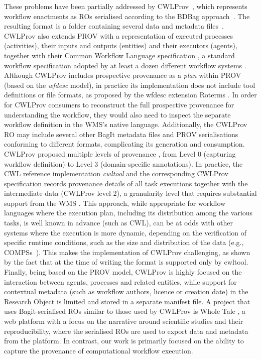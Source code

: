 These problems have been partially addressed by CWLProv~\cite{Khan 2019}, which represents workflow enactments as ROs serialised according to the BDBag approach~\cite{Chard 2016}.
The resulting format is a folder containing several data and metadata files~\cite{Soiland-Reyes 2018}.
CWLProv also extends PROV with a representation of executed processes (activities), their inputs and outputs (entities) and their executors (agents), together with their Common Workflow Language specification
\cite{Crusoe 2022}, a standard workflow specification adopted by at least a dozen different workflow systems . Although CWLProv includes prospective provenance as a \emph{plan}
within PROV (based on the \emph{wfdesc} model), in practice its implementation does not include tool definitions or file formats, as proposed by the wfdesc extension Roterms .
In order for CWLProv consumers to reconstruct the full prospective provenance for understanding the workflow, they would also need to inspect the separate workflow definition in the WMS's native language.
Additionally, the CWLProv RO may include several other BagIt metadata files and PROV serialisations conforming to different formats, complicating its generation and consumption.
CWLProv proposed multiple levels of provenance \cite[figure 2]{Khan 2019}, from Level 0 (capturing workflow definition) to Level 3 (domain-specific annotations). 
In practice, the CWL reference implementation \emph{cwltool} \cite{Amstutz 2023} and the corresponding CWLProv specification \cite{Soiland-Reyes 2018} records provenance details of all task executions together with the intermediate data (CWLProv level 2), a granularity level that requires substantial support from the WMS
\cite{Soiland-Reyes 2022}.
This approach, while appropriate for workflow languages where the execution plan, including its distribution among the various tasks, is well known in advance (such as CWL), can be at odds with other systems where the execution is more dynamic, depending on the verification of specific runtime conditions, such as the size and distribution of the data (e.g., COMPSs~\cite{Lordan 2014}).
This makes the implementation of CWLProv challenging, as shown by the fact that at the time of writing the format is supported only by cwltool.
Finally, being based on the PROV model, CWLProv is highly focused on the interaction between agents, processes and related entities, while support for contextual metadata (such as workflow authors, licence or creation date) in the Research Object is limited  and stored in a separate manifest file.
A project that uses Bagit-serialised ROs similar to those used by CWLProv is Whole Tale \cite{Chard 2019}, a web platform with a focus on the narrative around scientific studies and their reproducibility, where the serialised ROs are used to export data and metadata from the platform. In contrast, our work is primarily focused on the ability to capture the provenance of computational workflow execution.



